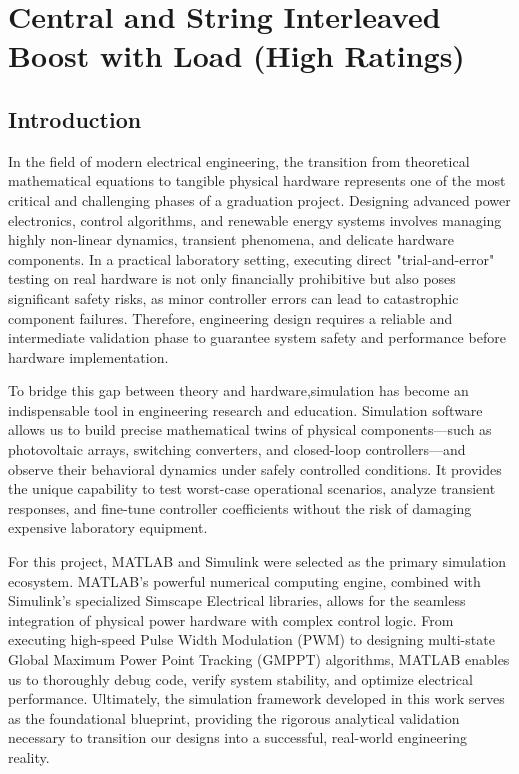 
\section{Central and String Interleaved Boost with Load (High Ratings)}

\subsection{Introduction}
In the field of modern electrical engineering, the transition from theoretical mathematical equations to tangible physical hardware represents one of the most critical and challenging phases of a graduation project. Designing advanced power electronics, control algorithms, and renewable energy systems involves managing highly non-linear dynamics, transient phenomena, and delicate hardware components. In a practical laboratory setting, executing direct "trial-and-error" testing on real hardware is not only financially prohibitive but also poses significant safety risks, as minor controller errors can lead to catastrophic component failures. Therefore, engineering design requires a reliable and intermediate validation phase to guarantee system safety and performance before hardware implementation.

To bridge this gap between theory and hardware,simulation has become an indispensable tool in engineering research and education. Simulation software allows us to build precise mathematical twins of physical components—such as photovoltaic arrays, switching converters, and closed-loop controllers—and observe their behavioral dynamics under safely controlled conditions. It provides the unique capability to test worst-case operational scenarios, analyze transient responses, and fine-tune controller coefficients without the risk of damaging expensive laboratory equipment.

For this project, MATLAB and Simulink were selected as the primary simulation ecosystem. MATLAB’s powerful numerical computing engine, combined with Simulink’s specialized Simscape Electrical libraries, allows for the seamless integration of physical power hardware with complex control logic. From executing high-speed Pulse Width Modulation (PWM) to designing multi-state Global Maximum Power Point Tracking (GMPPT) algorithms, MATLAB enables us to thoroughly debug code, verify system stability, and optimize electrical performance. Ultimately, the simulation framework developed in this work serves as the foundational blueprint, providing the rigorous analytical validation necessary to transition our designs into a successful, real-world engineering reality.
\newpage


